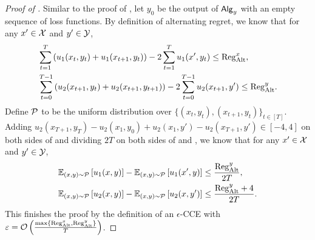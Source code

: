 \begin{proof}[Proof of ]
    Similar to the proof of , let $y_0$ be the output of ${\mathsf{Alg}}_y$ with an empty sequence of loss functions. By definition of alternating regret, we know that for any $x'\in{\mathcal{X}}$ and $y'\in{\mathcal{Y}}$,
    \begin{align}
        &\sum_{t=1}^T\left(u_1(x_t,y_t)+u_1(x_{t+1},y_t)\right) - 2\sum_{t=1}^T u_1(x',y_t)\leq \mathrm{Reg}_{\mathrm{Alt}}^x,\label{eqn:gsum-1}\\
        &\sum_{t=0}^{T-1}\left(u_2(x_{t+1},y_{t})+u_2(x_{t+1},y_{t+1})\right) - 2\sum_{t=0}^{T-1} u_2(x_{t+1},y')\leq \mathrm{Reg}_{\mathrm{Alt}}^y.\label{eqn:gsum-2}
    \end{align}
    Define ${\mathcal{P}}$ to be the uniform distribution over $\{(x_t,y_t),(x_{t+1},y_t)\}_{t\in[T]}$.
    Adding $u_2(x_{T+1},y_T)-u_2(x_1,y_0)+u_2(x_1,y')-u_2(x_{T+1},y')\in[-4,4]$ on both sides of  and dividing $2T$ on both sides of  and , we know that for any $x'\in{\mathcal{X}}$ and $y'\in{\mathcal{Y}}$,
    \begin{align*}
    \mathbb{E}_{(x,y)\sim {\mathcal{P}}}\left[u_1(x,y)\right] - \mathbb{E}_{(x,y)\sim {\mathcal{P}}}\left[u_1(x',y)\right]&\leq \frac{\mathrm{Reg}_{\mathrm{Alt}}^y}{2T},\\
        \mathbb{E}_{(x,y)\sim {\mathcal{P}}}\left[u_2(x,y)\right] - \mathbb{E}_{(x,y)\sim {\mathcal{P}}}\left[u_2(x,y')\right]&\leq \frac{\mathrm{Reg}_{\mathrm{Alt}}^y + 4}{2T}.
    \end{align*}
    This finishes the proof by the definition of an $\epsilon$-CCE with $\varepsilon=\mathcal{O}\left(\frac{\max\{\mathrm{Reg}_{\mathrm{Alt}}^x, \mathrm{Reg}_{\mathrm{Alt}}^y\}}{T}\right)$.
\end{proof}